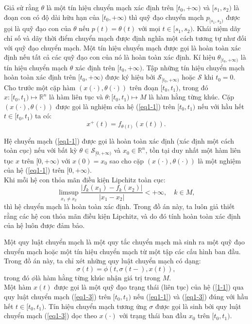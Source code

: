 \documentclass[14pt,a4paper,oneside]{report}		%
\begin{document}
Giả sử rằng $\theta$ là một tín hiệu chuyển mạch xác định trên $[t_0,+\infty)$ và $[s_1,s_2)$ là đoạn con có độ dài hữu hạn của $[t_0,+\infty)$ thì quỹ đạo chuyển mạch $p_{[s_1,s_2)}$ được gọi là quỹ đạo con của $\theta$ nếu $p(t)=\theta(t)$ với mọi $t\in[s_1,s_2)$. Khái niệm dãy chỉ số và dãy thời điểm chuyển mạch được định nghĩa một cách tương tự như đối với quỹ đạo chuyển mạch.
Một tín hiệu chuyển mạch được gọi là hoàn toàn xác định nếu tất cả các quỹ đạo con của nó là hoàn toàn xác định. Kí hiệu $\theta_{[t_0,+\infty)}$ là tín hiệu chuyển mạch $\theta$ xác định trên $[t_0,+\infty)$. Tập những tín hiệu chuyển mạch hoàn toàn xác định trên $[t_0,+\infty)$ được ký hiệu bởi $\mathcal{S}_{[t_0,+\infty)}$ hoặc $\mathcal{S}$ khi $t_0=0$.\\

Cho trước một cặp hàm $(x(\cdot),\theta(\cdot))$ trên đoạn $[t_0,t_1)$, trong đó $x:[t_0,t_1)\mapsto\mathbb{R}^n$ là hàm liên tục và $\theta:[t_0,t_1)\mapsto M$ là hàm hằng từng khúc. Cặp $(x(\cdot),\theta(\cdot))$ được gọi là nghiệm của hệ (\ref{eq1-1}) trên $[t_0,t_1)$ nếu với hầu hết $t\in [t_0,t_1)$ ta có:
$$x^+(t)=f_{\theta(t)}(x(t)).$$

Hệ chuyển mạch (\ref{eq1-1}) được gọi là hoàn toàn xác định (xác định một cách toàn cục) nếu với bất kỳ $\theta\in\mathcal{S}_{[0,+\infty)}$ và $x_0\in\mathbb{R}^n$, tồn tại duy nhất một hàm liên tục $x$ trên $[0,+\infty)$ với $x(0)=x_0$ sao cho cặp $(x(\cdot),\theta(\cdot))$ là một nghiệm của hệ (\ref{eq1-1}) trên $[0,+\infty)$.\\
Khi mỗi hệ con thỏa mãn điều kiện Lipchitz toàn cục:
$$\limsup_{x_1\neq x_2}\frac{|f_k(x_1)-f_k(x_2)|}{|x_1-x_2|} < +\infty,\quad k\in M,$$
thì hệ chuyển mạch là hoàn toàn xác định. Trong đồ án này, ta luôn giả thiết rằng các hệ con thỏa mãn điều kiện Lipchitz, và do đó tính hoàn toàn xác định của hệ luôn được đảm bảo.

Một quy luật chuyển mạch là một quy tắc chuyển mạch mà sinh ra một quỹ đạo chuyển mạch hoặc một tín hiệu chuyển mạch từ một tập các cấu hình ban đầu. Trong đồ án này, ta chỉ xét những quy luật chuyển mạch có dạng:
\begin{equation} \label{eq1-3}
\sigma(t)=\phi(t,\sigma(t-),x(t)),
\end{equation} 
trong đó $\phi$là hàm hằng từng khúc nhận giá trị trong $M$.\\
Một hàm $x(t)$ được gọi là một quỹ đạo trạng thái (liên tục) của hệ (\ref{1-1}) qua quy luật chuyển mạch (\ref{eq1-3}) trên $[t_0,t_1)$ nếu (\ref{eq1-1}) và (\ref{eq1-3}) đúng với hầu hết $t\in[t_0,t_1)$. Tín hiệu chuyển mạch tương ứng $\sigma$ được gọi là sinh bởi quy luật chuyển mạch (\ref{eq1-3}) dọc theo $x(\cdot)$ với trạng thái ban đầu $x_0$ trên $[t_0,t_1)$.
\end{document}
